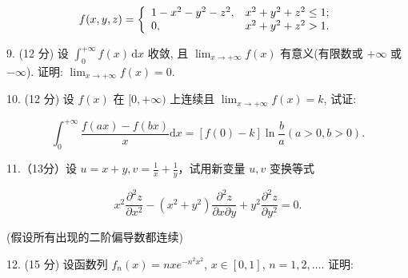 \documentclass{examcollection}
\renewcommand{\displayformula}[1]{\[#1\]}
\begin{document}
{\begin{minipage}{\textwidth}
\displayformula{f (x, y, z) = \left\{ \begin{array}{l l} 1 - x ^ {2} - y ^ {2} - z ^ {2}, & x ^ {2} + y ^ {2} + z ^ {2} \leq 1; \\ 0, & x ^ {2} + y ^ {2} + z ^ {2} > 1. \end{array} \right.}\par
9. (12 分) 设 $\int_{0}^{+\infty} f(x) \, \mathrm{d}x$ 收敛, 且 $\lim_{x \to +\infty} f(x)$ 有意义(有限数或 $+\infty$ 或 $-\infty$). 证明: $\lim_{x \to +\infty} f(x) = 0$.\par
10. (12 分) 设 $f(x)$ 在 $[0, +\infty)$ 上连续且 $\lim_{x \to +\infty} f(x) = k$, 试证:\par
\displayformula{\int_ {0} ^ {+ \infty} \frac {f (a x) - f (b x)}{x} \mathrm{d} x = [ f (0) - k ] \ln \frac {b}{a} (a > 0, b > 0).}\par
11.（13分）设 $u = x + y, v = \frac{1}{x} + \frac{1}{y}$，试用新变量 $u, v$ 变换等式\par
\displayformula{x ^ {2} \frac {\partial^ {2} z}{\partial x ^ {2}} - (x ^ {2} + y ^ {2}) \frac {\partial^ {2} z}{\partial x \partial y} + y ^ {2} \frac {\partial^ {2} z}{\partial y ^ {2}} = 0.}\par
(假设所有出现的二阶偏导数都连续)\par
12. (15 分) 设函数列 $f_{n}(x) = nxe^{-n^{2}x^{2}}$, $x \in [0,1]$, $n = 1,2,\dots$. 证明:\par
\end{minipage}}
\ifdim\dimexpr\ht\proofbox+\dp\proofbox\relax>\textheight
\noindent\resizebox{!}{\textheight}{\usebox{\proofbox}}\else\noindent\usebox{\proofbox}\fi\clearpage
\end{document}
